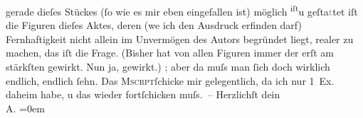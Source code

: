 \begin{ledgroupsized}[t]{13cm}
               gerade dieſes Stückes (ſo wie es mir eben eingefallen ist) \introOben{}möglich \substVorne{}\textsuperscript{iſt}\substDazwischen{}u\substHinten{} geſta\textcolor{gray}{t}tet iſt\introOben{} die Figuren dieſes Aktes, deren
                  (we{\geminationn} ich den Ausdruck erfinden darf) Fernhaftigkeit
               nicht allein im Unvermögen des Autors begründet liegt, realer zu machen, das iſt die
               Frage. (Bisher hat von allen Figuren immer der erſt am stärkſten gewirkt. Nun ja, gewirkt.)\pend
           \pstart
           \label{K_L01549_1v}\label{K_L01549_1h}; aber da{\geminationn} muſs man ſich doch wirklich
               endlich, endlich ſehn. Das \textsc{Mscrpt}ſchicke mir gelegentlich, da ich nur 1 Ex.
               daheim habe, u das wieder fortſchicken muſs. – \pend
           \pstart
           Herzlichſt dein{\\[\baselineskip]}\spacefill\mbox{A.}\pend
           \leftskip=0em{}
         
         \endnumbering{}\end{ledgroupsized}  \newcommand{\dateiname}{L01549}\newcommand{\titel}{Arthur Schnitzler an Hermann Bahr, 18. 9. 1905}\newcommand{\editorInnen}{ Kurt Ifkovits,  Martin Anton Müller}
      